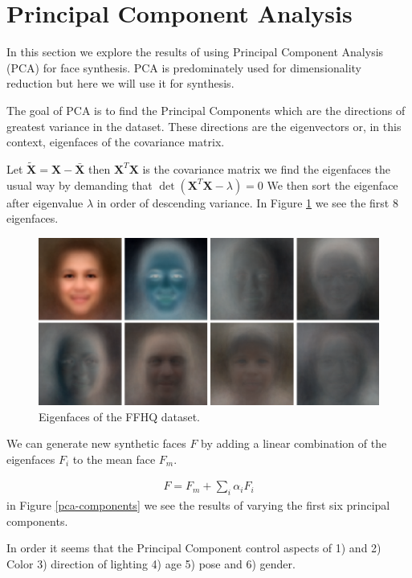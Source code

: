\section{Principal Component Analysis }
In this section we explore the results of using Principal Component Analysis (PCA) for face synthesis. PCA is predominately used for dimensionality reduction but here we will use it for synthesis.

The goal of PCA is to find the Principal Components which are the directions of greatest variance in the dataset. These directions are the eigenvectors or, in this context, eigenfaces of the covariance matrix.

Let $\tilde{\mathbf{X}} = \mathbf{X} - \bar{\mathbf{X}}$ then $\mathbf{X}^T\mathbf{X}$ is the covariance matrix we find the eigenfaces the usual way by demanding that $\det(\mathbf{X}^T\mathbf{X} - \lambda) = 0$
We then sort the eigenface after eigenvalue $\lambda$ in order of descending variance. In Figure \ref{eigenface} we see the first 8 eigenfaces.

\begin{figure}
  \includegraphics[width=\textwidth]{fig/PCA/pca}
  \caption{Eigenfaces of the FFHQ dataset.}
  \label{eigenface}
\end{figure}

We can generate new synthetic faces $F$ by adding a linear combination of the
eigenfaces $F_i$ to the mean face $F_m$.

\begin{align}
F  = F_m + \sum_{i} \alpha_i F_i
\end{align}
in Figure \ref{pca-components} we see the results of varying the first six
principal components.

In order it seems that the Principal Component control aspects of 1) and 2) Color 3) direction of lighting 4) age 5) pose and 6) gender.


